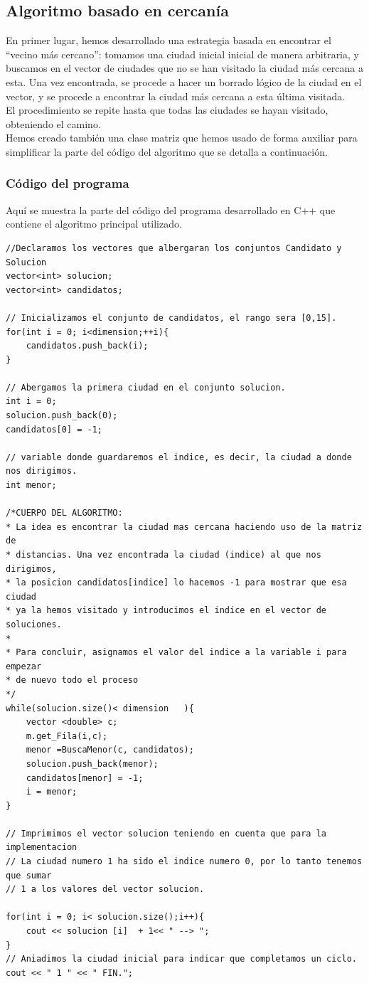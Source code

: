 \documentclass[11pt,a4paper]{article} %
\begin{document}
\subsection{Algoritmo basado en cercanía}

En primer lugar, hemos desarrollado una estrategia basada en encontrar el “vecino más cercano”: tomamos una ciudad inicial inicial de manera arbitraria, y buscamos en el vector de ciudades que no se han visitado la ciudad más cercana a esta. Una vez encontrada, se procede a hacer un borrado lógico de la ciudad en el vector, y se procede a encontrar la ciudad más cercana a esta última visitada.\\

El procedimiento se repite hasta que todas las ciudades se hayan visitado, obteniendo el camino.\\

Hemos creado también una clase matriz que hemos usado de forma auxiliar para simplificar la parte del código del algoritmo que se detalla a continuación.\\

\subsubsection{Código del programa}
Aquí se muestra la parte del código del programa desarrollado en C++ que contiene el algoritmo principal utilizado.

\begin{lstlisting}[style=C++]
//Declaramos los vectores que albergaran los conjuntos Candidato y Solucion
vector<int> solucion;
vector<int> candidatos;

// Inicializamos el conjunto de candidatos, el rango sera [0,15]. 
for(int i = 0; i<dimension;++i){
	candidatos.push_back(i);
}

// Abergamos la primera ciudad en el conjunto solucion.
int i = 0;
solucion.push_back(0);
candidatos[0] = -1;

// variable donde guardaremos el indice, es decir, la ciudad a donde nos dirigimos.
int menor;

/*CUERPO DEL ALGORITMO:
* La idea es encontrar la ciudad mas cercana haciendo uso de la matriz de
* distancias. Una vez encontrada la ciudad (indice) al que nos dirigimos,
* la posicion candidatos[indice] lo hacemos -1 para mostrar que esa ciudad
* ya la hemos visitado y introducimos el indice en el vector de soluciones.
* 
* Para concluir, asignamos el valor del indice a la variable i para empezar
* de nuevo todo el proceso
*/
while(solucion.size()< dimension   ){
	vector <double> c;
	m.get_Fila(i,c);
	menor =BuscaMenor(c, candidatos);
	solucion.push_back(menor);
	candidatos[menor] = -1;
	i = menor;
}

// Imprimimos el vector solucion teniendo en cuenta que para la implementacion
// La ciudad numero 1 ha sido el indice numero 0, por lo tanto tenemos que sumar
// 1 a los valores del vector solucion.

for(int i = 0; i< solucion.size();i++){
	cout << solucion [i]  + 1<< " --> ";
}
// Aniadimos la ciudad inicial para indicar que completamos un ciclo.
cout << " 1 " << " FIN.";
\end{lstlisting}
\end{document}
